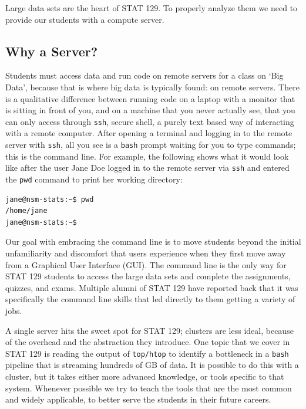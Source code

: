\documentclass[12pt]{article}
\begin{document}
Large data sets are the heart of STAT 129.
To properly analyze them we need to provide our students with a compute server.


\subsection{Why a Server?}
\label{sec:server}

Students must access data and run code on remote servers for a class on `Big Data', because that is where big data is typically found: on remote servers.
There is a qualitative difference between running code on a laptop with a monitor that is sitting in front of you, and on a machine that you never actually see, that you can only access through \texttt{ssh}, secure shell, a purely text based way of interacting with a remote computer.
After opening a terminal and logging in to the remote server with \texttt{ssh}, all you see is a \texttt{bash} prompt waiting for you to type commands; this is the command line.
For example, the following shows what it would look like after the user Jane Doe logged in to the remote server via \texttt{ssh} and entered the \texttt{pwd} command to print her working directory:
\begin{verbatim}
jane@nsm-stats:~$ pwd
/home/jane
jane@nsm-stats:~$
\end{verbatim}
Our goal with embracing the command line is to move students beyond the initial unfamiliarity and discomfort that users experience when they first move away from a Graphical User Interface (GUI).
The command line is the only way for STAT 129 students to access the large data sets and complete the assignments, quizzes, and exams.
Multiple alumni of STAT 129 have reported back that it was specifically the command line skills that led directly to them getting a variety of jobs.


A single server hits the sweet spot for STAT 129; clusters are less ideal, because of the overhead and the abstraction they introduce.
One topic that we cover in STAT 129 is reading the output of \texttt{top/htop} to identify a bottleneck in a \texttt{bash} pipeline that is streaming hundreds of GB of data.
It is possible to do this with a cluster, but it takes either more advanced knowledge, or tools specific to that system.
Whenever possible we try to teach the tools that are the most common and widely applicable, to better serve the students in their future careers.
\end{document}
